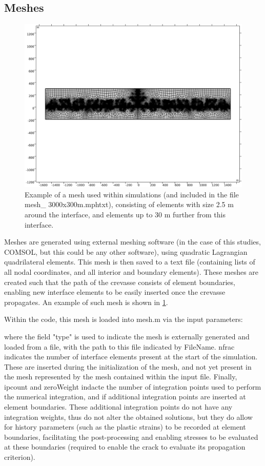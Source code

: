 \documentclass[3p]{elsarticle} %
\begin{document}
\subsection{Meshes}
\begin{figure}
	\centering
	\includegraphics[clip=true, width=12cm, trim={50 200 20 200}]{Figures/mesh.png}
	\caption{Example of a mesh used within simulations (and included in the file mesh\_ 3000x300m.mphtxt), consisting of elements with size 2.5 m around the interface, and elements up to 30 m further from this interface.}
	\label{fig:mesh}
\end{figure}
Meshes are generated using external meshing software (in the case of this studies, COMSOL, but this could be any other software), using quadratic Lagrangian quadrilateral elements. This mesh is then saved to a text file (containing lists of all nodal coordinates, and all interior and boundary elements). These meshes are created such that the path of the crevasse consists of element boundaries, enabling new interface elements to be easily inserted once the crevasse propagates. An example of such mesh is shown in \cref{fig:mesh}. 

Within the code, this mesh is loaded into mesh.m via the input parameters:

where the field "type" is used to indicate the mesh is externally generated and loaded from a file, with the path to this file indicated by FileName. nfrac indicates the number of interface elements present at the start of the simulation. These are inserted during the initialization of the mesh, and not yet present in the mesh represented by the mesh contained within the input file. Finally, ipcount and zeroWeight indacte the number of integration points used to perform the numerical integration, and if additional integration points are inserted at element boundaries. These additional integration points do not have any integration weights, thus do not alter the obtained solutions, but they do allow for history parameters (such as the plastic strains) to be recorded at element boundaries, facilitating the post-processing and enabling stresses to be evaluated at these boundaries (required to enable the crack to evaluate its propagation criterion). 
\end{document}
